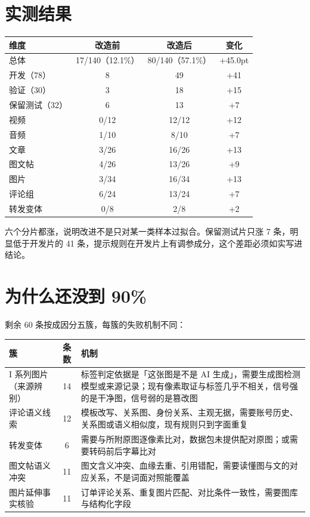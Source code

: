 \documentclass[11pt]{ctexart}
\begin{document}
\section{实测结果}

\begin{center}\small
\begin{tabular}{lccc}
\toprule
维度 & 改造前 & 改造后 & 变化 \\
\midrule
总体 & 17/140（12.1\%） & 80/140（57.1\%） & +45.0pt \\
开发（78） & 8 & 49 & +41 \\
验证（30） & 3 & 18 & +15 \\
保留测试（32） & 6 & 13 & +7 \\
\midrule
视频 & 0/12 & 12/12 & +12 \\
音频 & 1/10 & 8/10 & +7 \\
文章 & 3/26 & 16/26 & +13 \\
图文帖 & 4/26 & 13/26 & +9 \\
图片 & 3/34 & 16/34 & +13 \\
评论组 & 6/24 & 13/24 & +7 \\
转发变体 & 0/8 & 2/8 & +2 \\
\bottomrule
\end{tabular}
\end{center}

六个分片都涨，说明改进不是只对某一类样本过拟合。保留测试片只涨 7 条，明显低于开发片的 41 条，提示规则在开发片上有调参成分，这个差距必须如实写进结论。

\section{为什么还没到 90\%}

剩余 60 条按成因分五簇，每簇的失败机制不同：

\begin{center}\small
\begin{tabular}{p{3.4cm}cp{8.2cm}}
\toprule
簇 & 条数 & 机制 \\
\midrule
I 系列图片（来源辨别） & 14 & 标签判定依据是「这张图是不是 AI 生成」，需要生成图检测模型或来源记录；现有像素取证与标签几乎不相关，信号强的是干净图，信号弱的是篡改图 \\
评论语义线索 & 12 & 模板改写、关系图、身份关系、主观无据，需要账号历史、关系图或语义相似度，现有规则只到字面重复 \\
转发变体 & 6 & 需要与所附原图逐像素比对，数据包未提供配对原图；或需要转码前后字幕比对 \\
图文帖语义冲突 & 11 & 图文含义冲突、血缘去重、引用错配，需要读懂图与文的对应关系，不是词面对照能覆盖 \\
图片延伸事实核验 & 11 & 订单评论关系、重复图片匹配、对比条件一致性，需要图库与结构化字段 \\
\bottomrule
\end{tabular}
\end{center}
\end{document}
